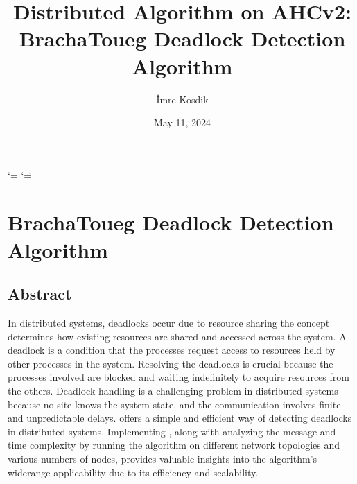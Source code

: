\documentclass[letterpaper,10pt,english]{sphinxmanual}
\title{Distributed Algorithm on AHCv2: Bracha\sphinxhyphen{}Toueg Deadlock Detection Algorithm}
\date{May 11, 2024}
\author{İmre Kosdik}
\begin{document}
\ifdefined\shorthandoff
  \ifnum\catcode`\=\string=\active\shorthandoff{=}\fi
  \ifnum\catcode`\"=\active{}\fi
\fi

\pagestyle{empty}
\sphinxmaketitle
\pagestyle{plain}
\sphinxtableofcontents
\pagestyle{normal}
\label{\detokenize{index::doc}}


\sphinxstepscope


\chapter{Bracha\sphinxhyphen{}Toueg Deadlock Detection Algorithm}
\label{\detokenize{docs/BrachaToueg/BrachaToueg:brachatouegalg}}\label{\detokenize{docs/BrachaToueg/BrachaToueg::doc}}
\sphinxstepscope


\section{Abstract}
\label{\detokenize{docs/BrachaToueg/abstract:abstract}}\label{\detokenize{docs/BrachaToueg/abstract::doc}}
\sphinxAtStartPar
In distributed systems, deadlocks occur due to resource sharing \sphinxhyphen{} the concept determines how existing resources are shared and accessed across the system. A deadlock is a condition that the processes request access to resources held by other processes in the system. Resolving the deadlocks is crucial because the processes involved are blocked and waiting indefinitely to acquire resources from the others. Deadlock handling is a challenging problem in distributed systems because no site knows the system state, and the communication involves finite and unpredictable delays. {\hyperref[\detokenize{docs/BrachaToueg/algorithm:brachatouegdeadlockdetectionalgorithm}]{}} offers a simple and efficient way of detecting deadlocks in distributed systems. Implementing {\hyperref[\detokenize{docs/BrachaToueg/algorithm:brachatouegdeadlockdetectionalgorithm}]{}}, along with analyzing the message and time complexity by running the algorithm on different network topologies and various numbers of nodes, provides valuable insights into the algorithm’s wide\sphinxhyphen{}range applicability due to its efficiency and scalability.

\sphinxstepscope
\end{document}
